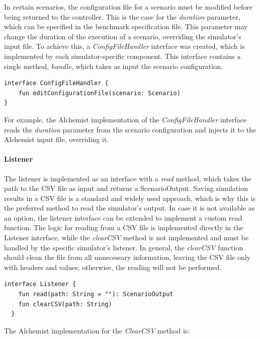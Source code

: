 \documentclass[12pt,a4paper,openright,twoside]{book}
\begin{document}
In certain scenarios, the configuration file for a scenario must be modified before being returned to the controller.
This is the case for the \emph{duration} parameter, which can be specified in the benchmark specification file.
This parameter may change the duration of the execution of a scenario, overriding the simulator's input file. 
To achieve this, a \emph{ConfigFileHandler} interface was created, which is implemented by each simulator-specific component.
This interface contains a single method, \emph{handle}, which takes as input the scenario configuration.

\begin{lstlisting}[style=my-kotlin, language=my-kotlin, caption={ConfigFileHandler interface}]
  interface ConfigFileHandler {
    fun editConfigurationFile(scenario: Scenario)
}
\end{lstlisting}

For example, the Alchemist implementation of the \emph{ConfigFileHandler} interface reads the \emph{duration} parameter from the scenario configuration and injects it to the Alchemist input file, overriding it.

\paragraph*{Listener}
The listener is implemented as an interface with a \emph{read} method, which takes the path to the CSV file as input and returns a ScenarioOutput. 
Saving simulation results in a CSV file is a standard and widely used approach, which is why this is the preferred method to read the simulator's output. 
In case it is not available as an option, the listener interface can be extended to implement a custom read function. 
The logic for reading from a CSV file is implemented directly in the Listener interface, while the \emph{clearCSV} method is not implemented and must be handled by the specific simulator's listener. 
In general, the \emph{clearCSV} function should clean the file from all unnecessary information, leaving the CSV file only with headers and values; otherwise, the reading will not be performed.

\begin{lstlisting}[style=my-kotlin, language=my-kotlin, caption={Listener interface.}]
  interface Listener {
    fun read(path: String = ""): ScenarioOutput
    fun clearCSV(path: String)
  }
\end{lstlisting}

The Alchemist implementation for the \emph{ClearCSV} method is:
\end{document}
